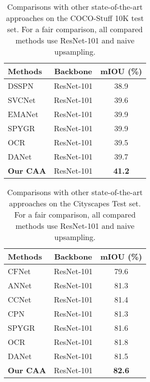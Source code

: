 \documentclass[letterpaper]{article} \usepackage{aaai22}  \usepackage{times}  \usepackage{helvet}  \usepackage{courier}  \usepackage[hyphens]{url}  \usepackage{graphicx} \urlstyle{rm} \def\UrlFont{\rm}  \usepackage{natbib}  \usepackage{caption} \DeclareCaptionStyle{ruled}{labelfont=normalfont,labelsep=colon,strut=off} \frenchspacing  \setlength{\pdfpagewidth}{8.5in}  \setlength{\pdfpageheight}{11in}  \usepackage{algorithm}
\begin{document}
\begin{table}[t]
	\centering
	\small
	\begin{tabular}{l|c|c}
		\toprule[1pt]
		\rule{0pt}{2ex} Methods & Backbone & mIOU (\%) \\
		\midrule[0.5pt]
		\midrule[0.5pt]
		DSSPN~\cite{cDSSPN} & ResNet-101 & 38.9 \\
		SVCNet~\cite{cSVCNet} & ResNet-101 & 39.6 \\
		EMANet~\cite{cEMANet} & ResNet-101 & 39.9 \\
		SPYGR~\cite{cSPYGR} & ResNet-101 & 39.9 \\
		OCR~\cite{cOCR} & ResNet-101 & 39.5 \\
		\midrule[0.5pt]
		DANet~\cite{cDualAttention} & ResNet-101 & 39.7\\
		\midrule[0.5pt]
		\textbf{Our CAA} & ResNet-101 & \textbf{41.2} \\
		\bottomrule[0.5pt]
	\end{tabular}
	\caption{Comparisons with other state-of-the-art approaches on the COCO-Stuff 10K test set. For a fair comparison, all compared methods use ResNet-101 and naive upsampling.}
	\label{tabCocostuffSOTA}
\end{table}

\begin{table}[!t]
	\centering
	\small
	\begin{tabular}{l|c|c}
		\toprule[1pt]
		\rule{0pt}{2ex} Methods & Backbone & mIOU (\%) \\
		\midrule[0.5pt]
		\midrule[0.5pt]
		CFNet~\cite{cCFNet} & ResNet-101 & 79.6 \\
		ANNet~\cite{cANNN} & ResNet-101 & 81.3 \\
		CCNet~\cite{cCCNet} & ResNet-101 & 81.4 \\
		CPN~\cite{cCPN} & ResNet-101 & 81.3 \\
		SPYGR~\cite{cSPYGR} & ResNet-101 & 81.6 \\
		OCR~\cite{cOCR} & ResNet-101 & 81.8 \\
		\midrule[0.5pt]
		DANet~\cite{cDualAttention} & ResNet-101 & 81.5\\
		\midrule[0.5pt]
		\textbf{Our CAA} & ResNet-101 & \textbf{82.6} \\
		\bottomrule[1pt]
	\end{tabular}
	\caption{Comparisons with other state-of-the-art approaches on the Cityscapes Test set. For a fair comparison, all compared methods use ResNet-101 and naive upsampling.}
	\label{tabCityscapesSOTA}
\end{table}
\end{document}
